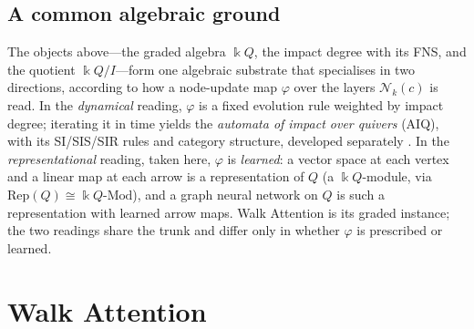 \documentclass[runningheads]{llncs}
\newcommand{\kk}{\Bbbk}
\newcommand{\kQ}{\kk Q}
\begin{document}
\subsection{A common algebraic ground}\label{sec:ground}

The objects above---the graded algebra $\kQ$, the impact degree with its FNS,
and the quotient $\kQ/I$---form one algebraic substrate that specialises in two
directions, according to how a node-update map $\varphi$ over the layers
$\mathcal{N}_k(c)$ is read. In the \emph{dynamical} reading, $\varphi$ is a
fixed evolution rule weighted by impact degree; iterating it in time yields the
\emph{automata of impact over quivers} (AIQ), with its SI/SIS/SIR rules and
category structure, developed separately
\cite{zainea2026aiq,ibanez2025casimulations}. In the \emph{representational}
reading, taken here, $\varphi$ is \emph{learned}: a vector space at each vertex
and a linear map at each arrow is a representation of $Q$ (a $\kQ$-module, via
$\mathrm{Rep}(Q)\cong\kQ\text{-}\mathrm{Mod}$), and a graph neural network on
$Q$ is such a representation with learned arrow maps. Walk Attention is its
graded instance; the two readings share the trunk and differ only in whether
$\varphi$ is prescribed or learned.

\section{Walk Attention}\label{sec:model}
\end{document}
